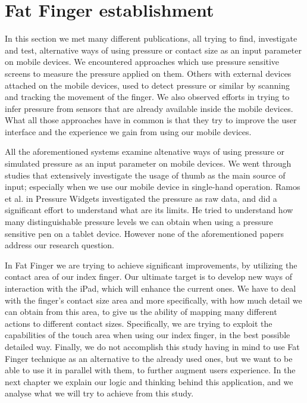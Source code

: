 \section{Fat Finger establishment}

In this section we met many different publications, all trying to find, investigate and test, alternative ways of using pressure or contact size as an input parameter on mobile devices. We encountered approaches which use pressure sensitive screens to measure the pressure applied on them. Others with external devices attached on the mobile devices, used to detect pressure or similar by scanning and tracking the movement of the finger. We also observed efforts in trying to infer pressure from sensors that are already available inside the mobile devices. What all those approaches have in common is that they try to improve the user interface and the  experience we gain from using our mobile devices.

All the aforementioned systems examine altenative ways of using pressure or simulated pressure as an input parameter on mobile devices. We went through studies that extensively investigate the usage of thumb as the main source of input; especially when we use our mobile device in single-hand operation. Ramos et al. in Pressure Widgets \cite{Ramos2004} investigated the pressure as raw data, and did a significant effort to understand what are its limits. He tried to understand how many distinguishable pressure levels we can obtain when using a pressure sensitive pen on a tablet device. However none of the aforementioned papers address our research question.

In Fat Finger we are trying to achieve significant improvements, by utilizing the contact area of our index finger. Our ultimate target is to develop new ways of interaction with the iPad, which will enhance the current ones. We have to deal with the finger’s contact size area and more specifically, with how much detail we can obtain from this area, to give us the ability of mapping many different actions to different contact sizes. Specifically, we are trying to exploit the capabilities of the touch area when using our index finger, in the best possible detailed way. Finally, we do not accomplish this study having in mind to use Fat Finger technique as an alternative to the already used ones, but we want to be able to use it in parallel with them, to further augment users experience. In the next chapter we explain our logic and thinking behind this application, and we analyse what we will try to achieve from this study.